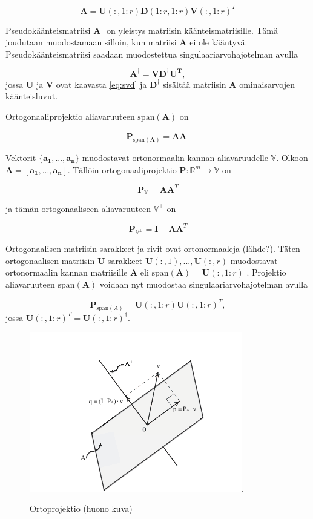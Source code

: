 \begin{equation}
    \mathbf{A} = \mathbf{U}(:,1:r)\mathbf{D}(1:r,1:r)\mathbf{V}(:,1:r)^T
    \label{eq:2}
\end{equation}


Pseudokäänteismatriisi $\mathbf{A^{\dagger}}$ on yleistys matriisin käänteismatriisille. Tämä joudutaan muodostamaan silloin, kun matriisi $\mathbf{A}$ ei ole kääntyvä. Pseudokäänteismatriisi saadaan muodostettua singulaariarvohajotelman avulla

\begin{equation}
    \mathbf{A^{\dagger} = VD^{\dagger}U^T},
\end{equation}
jossa \textbf{U} ja \textbf{V} ovat kaavasta \ref{eq:svd} ja $\mathbf{D}^{\dagger}$ sisältää matriisin \textbf{A} ominaisarvojen käänteisluvut.

Ortogonaaliprojektio aliavaruuteen $\text{span}(\mathbf{A})$ on 

\begin{equation}
    \mathbf{P}_{\text{span}(\mathbf{A})}= \mathbf{AA}^{\dagger}
\end{equation}

Vektorit $\{\mathbf{a_1,...,a_n}\}$ muodostavat ortonormaalin kannan aliavaruudelle $\mathbb{V}$. Olkoon $\mathbf{A = [\mathbf{a_1,...,a_n}]}$. Tällöin ortogonaaliprojektio $\mathbf{P}: \mathbb{R}^m \to \mathbb{V}$ on

\begin{equation}
    \mathbf{P}_{\mathbb{V}} = \mathbf{AA}^T
\end{equation}

ja tämän ortogonaaliseen aliavaruuteen $\mathbb{V}^{\bot}$ on

\begin{equation}
    \mathbf{P}_{\mathbb{V}^{\bot}}=\mathbf{I}-\mathbf{AA}^T
\end{equation}

Ortogonaalisen matriisin sarakkeet ja rivit ovat ortonormaaleja (lähde?). Täten ortogonaalisen matriisin \textbf{U} sarakkeet $\mathbf{U}(:,1),...,\mathbf{U}(:,r)$ muodostavat ortonormaalin kannan matriisille \textbf{A} eli $\text{span}(\mathbf{A}) = \mathbf{U}(:,1:r)$ \citep{Uusitalo1997Signal-spaceComponents}. Projektio aliavaruuteen $\text{span}(\mathbf{A})$ voidaan nyt muodostaa singulaariarvohajotelman avulla

\begin{equation}
    \mathbf{P}_{\text{span}(A)} = \mathbf{U}(:,1:r)\mathbf{U}(:,1:r)^T,
    \label{eq:6}
\end{equation}
jossa $\mathbf{U}(:,1:r)^T = \mathbf{U}(:,1:r)^{\dagger}$.

\begin{figure}[h]
    \centering
    \includegraphics[width=.7\textwidth]{ortoprojektio.png}.
    \caption{Ortoprojektio (huono kuva)}
\end{figure}